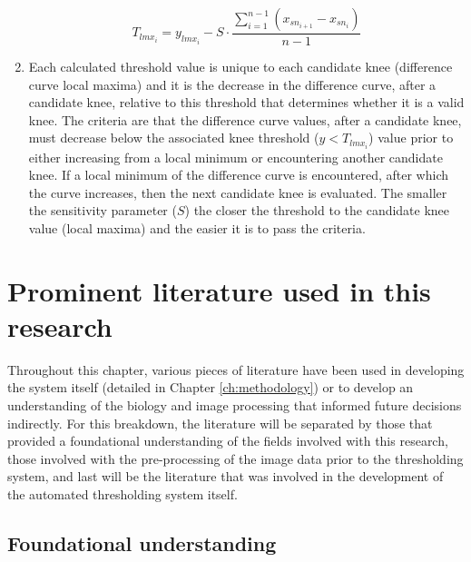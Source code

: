 \begin{enumerate}
    \begin{equation}\label{eq:knee_threshold}
        T_{lmx_i} = y_{lmx_i}-S\cdot \frac{\sum_{i=1}^{n-1}(x_{sn_{i+1}}-x_{sn_i})}{n-1}
    \end{equation}
    \item Each calculated threshold value is unique to each candidate knee (difference curve local maxima) and it is the decrease in the difference curve, after a candidate knee, relative to this threshold that determines whether it is a valid knee. The criteria are that the difference curve values, after a candidate knee, must decrease below the associated knee threshold ($y < T_{lmx_i}$) value prior to either increasing from a local minimum or encountering another candidate knee. If a local minimum of the difference curve is encountered, after which the curve increases, then the next candidate knee is evaluated. The smaller the sensitivity parameter ($S$) the closer the threshold to the candidate knee value (local maxima) and the easier it is to pass the criteria.
\end{enumerate}

\section{Prominent literature used in this research}
Throughout this chapter, various pieces of literature have been used in developing the system itself (detailed in Chapter \ref{ch:methodology}) or to develop an understanding of the biology and image processing that informed future decisions indirectly. For this breakdown, the literature will be separated by those that provided a foundational understanding of the fields involved with this research, those involved with the pre-processing of the image data prior to the thresholding system, and last will be the literature that was involved in the development of the automated thresholding system itself.
\subsection*{Foundational understanding}
